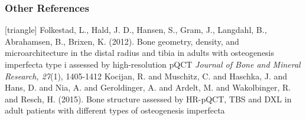 \documentclass[xcolor=table]{beamer}
\begin{document}
\begin{frame}
	\frametitle{Other References}
	\footnotesize{
		\begin{thebibliography}{99}
			[triangle]
			 Folkestad, L., Hald, J. D., Hansen, S., Gram, J., Langdahl, B., Abrahamsen, B., Brixen, K. (2012).
			\newblock Bone geometry, density, and microarchitecture in the distal radius and tibia in adults with osteogenesis imperfecta type i assessed by high-resolution pQCT
			\newblock \textit{Journal of Bone and Mineral Research, 27}(1), 1405-1412
			\vspace{1mm}
			 Kocijan, R. and Muschitz, C. and Haschka, J. and Hans, D. and Nia, A. and Geroldinger, A. and Ardelt, M. and Wakolbinger, R. and Resch, H. (2015).
			\newblock Bone structure assessed by HR-pQCT, TBS and DXL in adult patients with different types of osteogenesis imperfecta
		\end{thebibliography}
	}
\end{frame}

\end{document}
